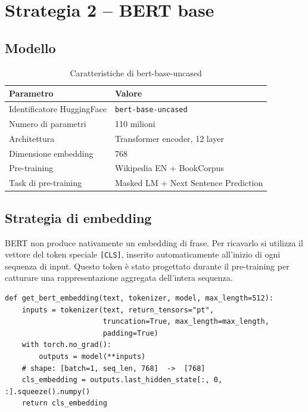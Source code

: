 \documentclass[12pt, a4paper]{report}
\begin{document}
% 
\section{Strategia 2 -- BERT base}

\subsection{Modello}

\begin{table}[H]
\centering
\begin{tabular}{ll}
\toprule
\textbf{Parametro} & \textbf{Valore} \\
\midrule
Identificatore HuggingFace & \texttt{bert-base-uncased} \\
Numero di parametri & 110 milioni \\
Architettura & Transformer encoder, 12 layer \\
Dimensione embedding & 768 \\
Pre-training & Wikipedia EN + BookCorpus \\
Task di pre-training & Masked LM + Next Sentence Prediction \\
\bottomrule
\end{tabular}
\caption{Caratteristiche di bert-base-uncased}
\end{table}

\subsection{Strategia di embedding}

BERT non produce nativamente un embedding di frase. Per ricavarlo si
utilizza il vettore del token speciale \texttt{[CLS]}, inserito
automaticamente all'inizio di ogni sequenza di input. Questo token è
stato progettato durante il pre-training per catturare una
rappresentazione aggregata dell'intera sequenza.

\begin{lstlisting}[caption={Estrazione embedding [CLS] da BERT}]
def get_bert_embedding(text, tokenizer, model, max_length=512):
    inputs = tokenizer(text, return_tensors="pt",
                       truncation=True, max_length=max_length,
                       padding=True)
    with torch.no_grad():
        outputs = model(**inputs)
    # shape: [batch=1, seq_len, 768]  ->  [768]
    cls_embedding = outputs.last_hidden_state[:, 0, :].squeeze().numpy()
    return cls_embedding
\end{lstlisting}
\end{document}
